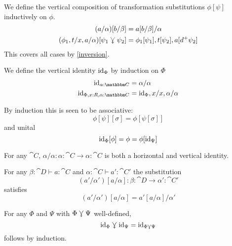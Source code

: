 \documentclass{llncs}
\begin{document}
\begin{definition}
  \label{lem:vertical-sq-cat}
  We define the vertical composition of transformation substitutions
  $\phi[\psi]$ inductively on $\phi$.
  \begin{align*}
    (a/\alpha)[b/\beta] &= a[b/\beta]/\alpha\\
    (\phi_1,t/x,a/\alpha)[\psi_1\curlyveedownarrow\psi_2] &= \phi_1[\psi_1], t[\psi_2],a[d^+\psi_2]
  \end{align*}
  This covers all cases by \cref{inversion}.

  We define the vertical identity $\textrm{id}_\Phi$ by induction on $\Phi$
  \begin{align*}
    \id_{\alpha:\cat C} &= \alpha/\alpha\\
    \id_{\Phi,x:R,\alpha:\cat C} &= \id_{\Phi},x/x,\alpha/\alpha
  \end{align*}

  By induction this is seen to be associative:
  \[ \phi[\psi][\sigma] = \phi[\psi[\sigma]] \]
  and unital
  \[ \textrm{id}_{\Phi}[\phi] = \phi = \phi[\textrm{id}_{\Psi}] \]
\end{definition}

\begin{lemma}
  \label{lem:sq-vid-hid}
  For any $\cat C$, $\alpha/\alpha : \alpha:\cat C \to \alpha:\cat C$
  is both a horizontal and vertical identity.
\end{lemma}

\begin{lemma}
  \label{lem:sq-vcomp-hid}
  For any $\beta:\cat D \vdash a : \cat C$ and $\alpha:\cat C \vdash a': \cat C'$
  the substitution
  \[ (a'/\alpha')[a/\alpha] : \beta:\cat D \to \alpha':\cat C' \]
  satisfies
  \[ (a'/\alpha')[a/\alpha] = a'[a/\alpha]/\alpha' \]
\end{lemma}

\begin{lemma}
  \label{lem:sq-vid-hcomp}
  For any $\Phi$ and $\Psi$ with $\Phi\curlyveedownarrow \Psi$ well-defined,
  \[ \textrm{id}_\Phi \curlyveedownarrow \textrm{id}_\Psi = \textrm{id}_{\Phi\curlyveedownarrow\Psi} \]
  follows by induction.
\end{lemma}
\end{document}
